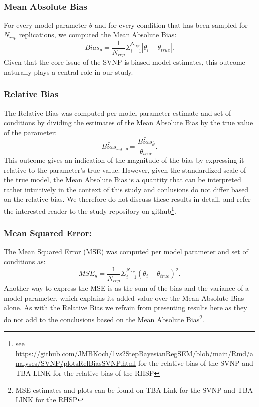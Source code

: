 \documentclass[
  man, donotrepeattitle,floatsintext]{apa6}
\begin{document}
~

\hypertarget{mean-absolute-bias}{%
\subsubsection{Mean Absolute Bias}\label{mean-absolute-bias}}

For every model parameter \(\theta\) and for every condition that has been sampled for \(N_{rep}\) replications, we computed the Mean Absolute Bias:
\[\bar{Bias}_{\bar{\theta}} = \frac{1}{N_{rep}} \Sigma_{i = 1}^{N_{rep}} |\bar{\theta_i} - \theta_{true}|.\]
Given that the core issue of the SVNP is biased model estimates, this outcome naturally plays a central role in our study.

\hypertarget{relative-bias}{%
\subsubsection{Relative Bias}\label{relative-bias}}

The Relative Bias was computed per model parameter estimate and set of conditions by dividing the estimates of the Mean Absolute Bias by the true value of the parameter:
\[\bar{Bias}_{rel, \ \bar{\theta} } = \frac{\bar{Bias}_{\bar{\theta}}}{\theta_{true} }.\]
This outcome gives an indication of the magnitude of the bias by expressing it relative to the parameter's true value. However, given the standardized scale of the true model, the Mean Absolute Bias is a quantity that can be interpreted rather intuitively in the context of this study and conlusions do not differ based on the relative bias. We therefore do not discuss these results in detail, and refer the interested reader to the study repository on github\footnote{see \url{https://github.com/JMBKoch/1vs2StepBayesianRegSEM/blob/main/Rmd/analyses/SVNP/plotsRelBiasSVNP.html} for the relative bias of the SVNP and TBA LINK for the relative bias of the RHSP}.

\hypertarget{mean-squared-error}{%
\subsubsection{Mean Squared Error:}\label{mean-squared-error}}

The Mean Squared Error (MSE) was computed per model parameter and set of conditions as:
\[MSE_{\bar{\theta}} = \frac{1}{N_{rep}} \Sigma_{i = 1}^{N_{rep}} (\bar{\theta_i} - \theta_{true})^2.\]
Another way to express the MSE is as the sum of the bias and the variance of a model parameter, which explains its added value over the Mean Absolute Bias alone. As with the Relative Bias we refrain from presenting results here as they do not add to the conclusions based on the Mean Absolute Bias\footnote{MSE estimates and plots can be found on TBA Link for the SVNP and TBA LINK for the RHSP}.
\end{document}

